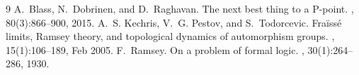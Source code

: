 \begin{thebibliography}{9}
A.~Blass, N.~Dobrinen, and D.~Raghavan.
\newblock The next best thing to a {P}-point.
, 80(3):866–900, 2015.
A.~S. Kechris, V.~G. Pestov, and S.~Todorcevic.
\newblock Fra{\"i}ss{\'e} limits, {R}amsey theory, and topological dynamics of
  automorphism groups.
, 15(1):106--189, Feb
  2005.
F.~Ramsey.
\newblock On a problem of formal logic.
, 30(1):264--286, 1930.
\end{thebibliography}
